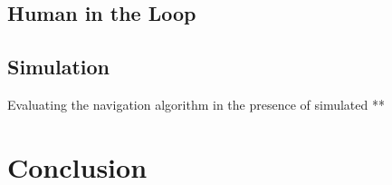 \documentclass[conference,letter,10pt,final]{IEEEtran}
\begin{document}
\subsection{Human in the Loop}
\label{sec:orgfff1880}
\cite{tsoi20seanep}

\subsection{Simulation}
\label{sec:org3f2030d}
Evaluating the navigation algorithm in the presence of simulated  \cite{tsoi20sean}
**

\section{Conclusion}
\label{sec:org3669fc5}


\end{document}
